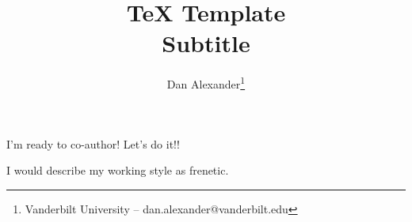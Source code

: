 \documentclass[english]{article}
\begin{document}
\title{TeX Template\\\Large Subtitle}
\author{Dan Alexander\footnote{Vanderbilt University -- dan.alexander@vanderbilt.edu}}
\maketitle

I'm ready to co-author! Let's do it!!

I would describe my working style as frenetic.










%
%

\end{document}
